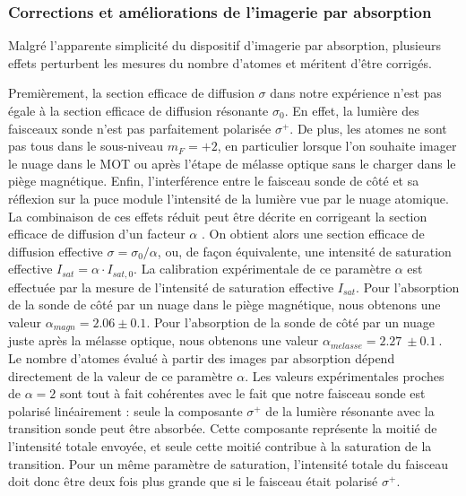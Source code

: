 \subsubsection*{Corrections et améliorations de l'imagerie par absorption}
\noindent Malgré l'apparente simplicité du dispositif d'imagerie par absorption, plusieurs effets perturbent les mesures du nombre d'atomes et méritent d'être corrigés.

Premièrement, la section efficace de diffusion $\sigma$ dans notre expérience n'est pas égale à la section efficace de diffusion résonante $\sigma_0$.
En effet, la lumière des faisceaux sonde n'est pas parfaitement polarisée $\sigma^+$.
De plus, les atomes ne sont pas tous dans le sous-niveau $m_F=+2$, en particulier lorsque l'on souhaite imager le nuage dans le MOT ou après l'étape de mélasse optique sans le charger dans le piège magnétique.
Enfin, l'interférence entre le faisceau sonde de côté et sa réflexion sur la puce module l'intensité de la lumière vue par le nuage atomique.
La combinaison de ces effets réduit peut être décrite en corrigeant la section efficace de diffusion d'un facteur $\alpha$ \cite{PHD_CELISTRINO,MX_GUERYODELIN_SATABSIM}.
On obtient alors une section efficace de diffusion effective $\sigma = \sigma_0 / \alpha$, ou, de façon équivalente, une intensité de saturation effective $I_{sat} = \alpha\cdot I_{sat,0}$.
La calibration expérimentale de ce paramètre $\alpha$ est effectuée par la mesure de l'intensité de saturation effective $I_{sat}$.
Pour l'absorption de la sonde de côté par un nuage dans le piège magnétique, nous obtenons une valeur $\alpha_{magn} = \num{2.06} \pm \num{0.1}$.
Pour l'absorption de la sonde de côté par un nuage juste après la mélasse optique, nous obtenons une valeur $\alpha_{melasse} = \SI{2.27}{} \pm \SI{0.1}{}$.
Le nombre d'atomes évalué à partir des images par absorption dépend directement de la valeur de ce paramètre $\alpha$.
Les valeurs expérimentales proches de $\alpha=2$ sont tout à fait cohérentes avec le fait que notre faisceau sonde est polarisé linéairement : seule la composante $\sigma^+$ de la lumière résonante avec la transition sonde peut être absorbée.
Cette composante représente la moitié de l'intensité totale envoyée, et seule cette moitié contribue à la saturation de la transition.
Pour un même paramètre de saturation, l'intensité totale du faisceau doit donc être deux fois plus grande que si le faisceau était polarisé $\sigma^+$.
	
